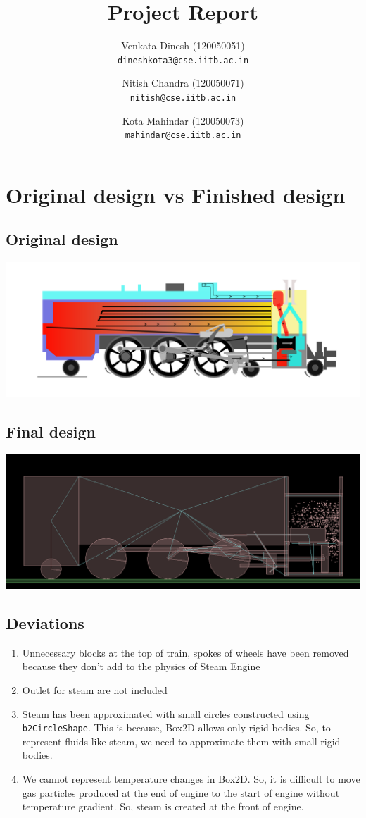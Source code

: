 \documentclass[11pt]{article}
\title{Project Report}
\author{Venkata Dinesh (120050051)\\
\texttt {dineshkota3@cse.iitb.ac.in}\and
Nitish Chandra (120050071)\\
\texttt{nitish@cse.iitb.ac.in}\and
Kota Mahindar (120050073)\\
\texttt{mahindar@cse.iitb.ac.in}
}
\date{}
\begin{document}
\maketitle
\section*{Original design vs Finished design}
\subsection*{Original design}
\includegraphics[scale = 0.1]{project.png}
\subsection*{Final design}
\includegraphics[scale = 0.3]{newtrain.png}
\subsection*{Deviations}
\begin{enumerate}
\item Unnecessary blocks at the top of train, spokes of wheels have been removed because they don't add to the physics of Steam Engine
\item Outlet for steam are not included 
\item Steam has been approximated with small circles constructed using {\tt b2CircleShape}. This is because, Box2D allows only rigid bodies. So, to represent fluids like steam, we need to approximate them with small rigid bodies.
\item We cannot represent temperature changes in Box2D. So, it is difficult to move gas particles produced at the end of engine to the start of engine without temperature gradient. So, steam is created at the front of engine.
\end{enumerate}
\end{document}
